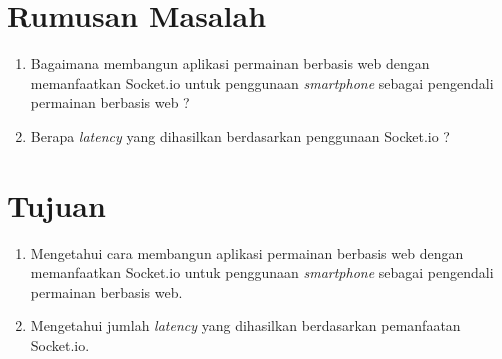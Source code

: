 

\section{Rumusan Masalah}
\label{sec:rumusan}

\begin{enumerate}
	\item Bagaimana membangun aplikasi permainan berbasis web dengan memanfaatkan Socket.io untuk penggunaan \textit{smartphone} sebagai pengendali permainan berbasis web ?
	\item Berapa \textit{latency} yang dihasilkan berdasarkan penggunaan Socket.io ? 
\end{enumerate}


\section{Tujuan}
\label{sec:tujuan}
\begin{enumerate}
	\item Mengetahui cara membangun aplikasi permainan berbasis web dengan memanfaatkan Socket.io untuk penggunaan \textit{smartphone} sebagai pengendali permainan berbasis web.
	\item Mengetahui jumlah \textit{latency} yang dihasilkan berdasarkan pemanfaatan Socket.io.
\end{enumerate}



